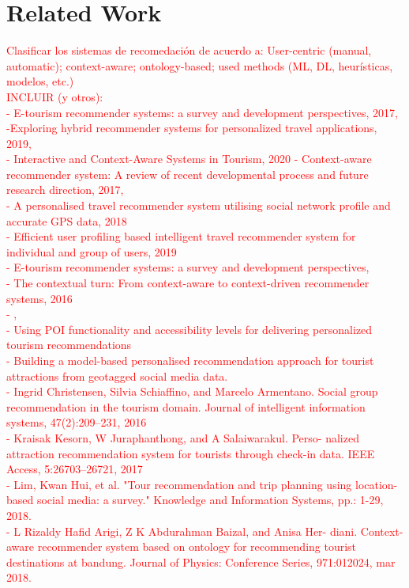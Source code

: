 \section{Related Work} \label{section:related-work}

\textcolor{red}{Clasificar los sistemas de recomedación de acuerdo a: User-centric (manual, automatic); context-aware; ontology-based; used methods (ML, DL, heurísticas, modelos, etc.)\\
INCLUIR (y otros):\\
- E-tourism recommender systems: a survey and development perspectives, 2017, \cite{artemenko2017tourism}\\
-Exploring hybrid recommender systems for personalized travel applications, 2019, \cite{logesh2019exploring}\\
- Interactive and Context-Aware Systems in Tourism, 2020
- Context-aware recommender system: A review of recent developmental process and future research direction, 2017,\\ 
- A personalised travel recommender system utilising social network profile and accurate GPS data, 2018\\
- Efficient user profiling based intelligent travel recommender system for individual and group of users, 2019\\
- E-tourism recommender systems: a survey and development perspectives,\\
- The contextual turn: From context-aware to context-driven recommender systems, 2016\\
- \cite{adomavicius2011context,rajaonarivo2019recommendation},\\
- Using POI functionality and accessibility levels for delivering personalized tourism recommendations\\
- Building a model-based personalised recommendation approach
for tourist attractions from geotagged social media data.\\
- Ingrid Christensen, Silvia Schiaffino, and Marcelo Armentano.
Social group recommendation in the tourism domain. Journal
of intelligent information systems, 47(2):209–231, 2016\\
- Kraisak Kesorn, W Juraphanthong, and A Salaiwarakul. Perso-
nalized attraction recommendation system for tourists through
check-in data. IEEE Access, 5:26703–26721, 2017\\
- Lim, Kwan Hui, et al. "Tour recommendation and trip planning using location-based social media: a survey."
Knowledge and Information Systems, pp.: 1-29, 2018.\\
- L Rizaldy Hafid Arigi, Z K Abdurahman Baizal, and Anisa Her-
diani. Context-aware recommender system based on ontology
for recommending tourist destinations at bandung. Journal of
Physics: Conference Series, 971:012024, mar 2018.
}

